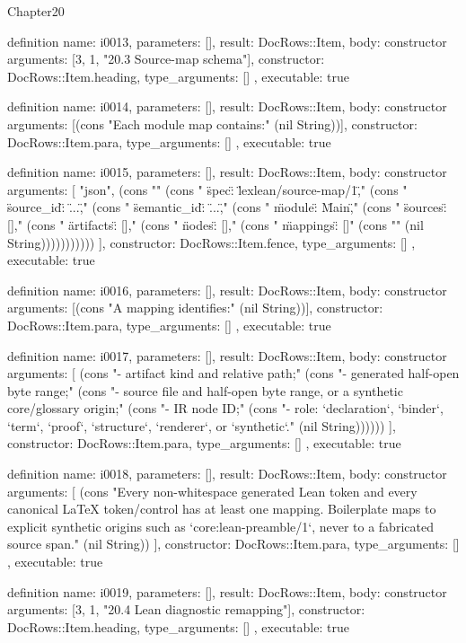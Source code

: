 \begin{lexlean}{Chapter20}
\begin{semanticmodule}
definition{
  name: i0013,
  parameters: [],
  result: DocRows::Item,
  body: constructor{
    arguments: [3, 1, "20.3 Source-map schema"],
    constructor: DocRows::Item.heading,
    type_arguments: []
  },
  executable: true
}

definition{
  name: i0014,
  parameters: [],
  result: DocRows::Item,
  body: constructor{
    arguments: [(cons "Each module map contains:" (nil String))],
    constructor: DocRows::Item.para,
    type_arguments: []
  },
  executable: true
}

definition{
  name: i0015,
  parameters: [],
  result: DocRows::Item,
  body: constructor{
    arguments: [
      "json",
      (cons "{" (cons "  \"spec\": \"lexlean/source-map/1\"," (cons "  \"source_id\": \"...\"," (cons "  \"semantic_id\": \"...\"," (cons "  \"module\": \"Main\"," (cons "  \"sources\": []," (cons "  \"artifacts\": []," (cons "  \"nodes\": []," (cons "  \"mappings\": []" (cons "}" (nil String)))))))))))
    ],
    constructor: DocRows::Item.fence,
    type_arguments: []
  },
  executable: true
}

definition{
  name: i0016,
  parameters: [],
  result: DocRows::Item,
  body: constructor{
    arguments: [(cons "A mapping identifies:" (nil String))],
    constructor: DocRows::Item.para,
    type_arguments: []
  },
  executable: true
}

definition{
  name: i0017,
  parameters: [],
  result: DocRows::Item,
  body: constructor{
    arguments: [
      (cons "- artifact kind and relative path;" (cons "- generated half-open byte range;" (cons "- source file and half-open byte range, or a synthetic core/glossary origin;" (cons "- IR node ID;" (cons "- role: `declaration`, `binder`, `term`, `proof`, `structure`, `renderer`, or `synthetic`." (nil String))))))
    ],
    constructor: DocRows::Item.para,
    type_arguments: []
  },
  executable: true
}

definition{
  name: i0018,
  parameters: [],
  result: DocRows::Item,
  body: constructor{
    arguments: [
      (cons "Every non-whitespace generated Lean token and every canonical LaTeX token/control has at least one mapping. Boilerplate maps to explicit synthetic origins such as `core:lean-preamble/1`, never to a fabricated source span." (nil String))
    ],
    constructor: DocRows::Item.para,
    type_arguments: []
  },
  executable: true
}

definition{
  name: i0019,
  parameters: [],
  result: DocRows::Item,
  body: constructor{
    arguments: [3, 1, "20.4 Lean diagnostic remapping"],
    constructor: DocRows::Item.heading,
    type_arguments: []
  },
  executable: true
}


\end{semanticmodule}
\end{lexlean}
